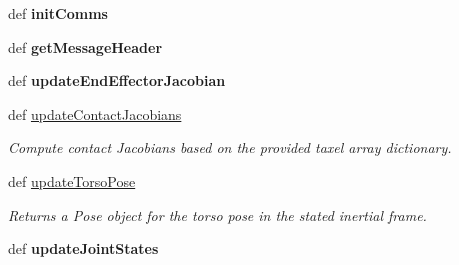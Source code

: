 \begin{DoxyCompactItemize}
\item 
\hypertarget{classhrl__haptic__mpc_1_1robot__haptic__state__node_1_1_robot_haptic_state_server_aab3a403c961d623b2ce7c3be65de657f}{def {\bfseries init\-Comms}}\label{classhrl__haptic__mpc_1_1robot__haptic__state__node_1_1_robot_haptic_state_server_aab3a403c961d623b2ce7c3be65de657f}

\item 
\hypertarget{classhrl__haptic__mpc_1_1robot__haptic__state__node_1_1_robot_haptic_state_server_aadc3895c76b778d3567d406a1a066f96}{def {\bfseries get\-Message\-Header}}\label{classhrl__haptic__mpc_1_1robot__haptic__state__node_1_1_robot_haptic_state_server_aadc3895c76b778d3567d406a1a066f96}

\item 
\hypertarget{classhrl__haptic__mpc_1_1robot__haptic__state__node_1_1_robot_haptic_state_server_a434275f7b46fcead52c73f2d20ccc3f2}{def {\bfseries update\-End\-Effector\-Jacobian}}\label{classhrl__haptic__mpc_1_1robot__haptic__state__node_1_1_robot_haptic_state_server_a434275f7b46fcead52c73f2d20ccc3f2}

\item 
def \hyperlink{classhrl__haptic__mpc_1_1robot__haptic__state__node_1_1_robot_haptic_state_server_a9edecc691aec48fcf8c18b3bd5882b4e}{update\-Contact\-Jacobians}
\begin{DoxyCompactList}\small\item\em \-Compute contact \-Jacobians based on the provided taxel array dictionary. \end{DoxyCompactList}\item 
\hypertarget{classhrl__haptic__mpc_1_1robot__haptic__state__node_1_1_robot_haptic_state_server_a8c47db0cf0ea09a2e703bd28009bf3c5}{def \hyperlink{classhrl__haptic__mpc_1_1robot__haptic__state__node_1_1_robot_haptic_state_server_a8c47db0cf0ea09a2e703bd28009bf3c5}{update\-Torso\-Pose}}\label{classhrl__haptic__mpc_1_1robot__haptic__state__node_1_1_robot_haptic_state_server_a8c47db0cf0ea09a2e703bd28009bf3c5}

\begin{DoxyCompactList}\small\item\em \-Returns a \-Pose object for the torso pose in the stated inertial frame. \end{DoxyCompactList}\item 
\hypertarget{classhrl__haptic__mpc_1_1robot__haptic__state__node_1_1_robot_haptic_state_server_ad7d5636151e1a954ff145cbc434d9651}{def {\bfseries update\-Joint\-States}}\label{classhrl__haptic__mpc_1_1robot__haptic__state__node_1_1_robot_haptic_state_server_ad7d5636151e1a954ff145cbc434d9651}


\end{DoxyCompactItemize}
